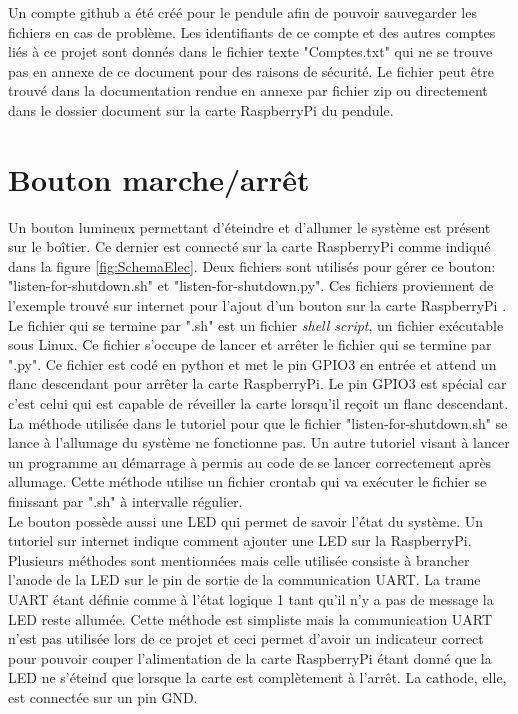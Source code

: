 Un compte github a été créé pour le pendule afin de pouvoir sauvegarder les fichiers en cas de problème. Les identifiants de ce compte et
des autres comptes liés à ce projet sont donnés dans le fichier texte "Comptes.txt" qui ne se trouve pas en annexe de ce document pour des
raisons de sécurité. Le fichier peut être trouvé dans la documentation rendue en annexe par fichier zip ou directement dans le dossier document
sur la carte RaspberryPi du pendule.

\section{Bouton marche/arrêt}
Un bouton lumineux permettant d'éteindre et d'allumer le système est présent sur le boîtier. Ce dernier est connecté sur la carte RaspberryPi comme
indiqué dans la figure \ref{fig:SchemaElec}. Deux fichiers sont utilisés pour gérer ce bouton: "listen-for-shutdown.sh" et "listen-for-shutdown.py".
Ces fichiers proviennent de l'exemple trouvé sur internet pour l'ajout d'un bouton sur la carte RaspberryPi \cite{ButtonAdd}. Le fichier qui se
termine par ".sh" est un fichier \textit{shell script}, un fichier exécutable sous Linux. Ce fichier s'occupe de lancer et arrêter le
fichier qui se termine par ".py". Ce fichier est codé en python et met le pin GPIO3 en entrée et attend un flanc descendant pour arrêter la
carte RaspberryPi. Le pin GPIO3 est spécial car c'est celui qui est capable de réveiller la carte lorsqu'il reçoit un flanc descendant.\\

La méthode utilisée dans le tutoriel pour que le fichier "listen-for-shutdown.sh" se lance à l'allumage du système ne fonctionne pas. Un autre
tutoriel visant à lancer un programme au démarrage \cite{ScriptStartup} à permis au code de se lancer correctement après allumage. Cette méthode
utilise un fichier crontab qui va exécuter le fichier se finissant par ".sh" à intervalle régulier.\\

Le bouton possède aussi une LED qui permet de savoir l'état du système. Un tutoriel sur internet \cite{LEDAdd} indique comment ajouter une LED
sur la RaspberryPi. Plusieurs méthodes sont mentionnées mais celle utilisée consiste à brancher l'anode de la LED sur le pin de sortie de la
communication UART. La trame UART étant définie comme à l'état logique 1 tant qu'il n'y a pas de message la LED reste allumée. Cette méthode
est simpliste mais la communication UART n'est pas utilisée lors de ce projet et ceci permet d'avoir un indicateur correct pour pouvoir couper
l'alimentation de la carte RaspberryPi étant donné que la LED ne s'éteind que lorsque la carte est complètement à l'arrêt. La cathode, elle,
est connectée sur un pin GND.

